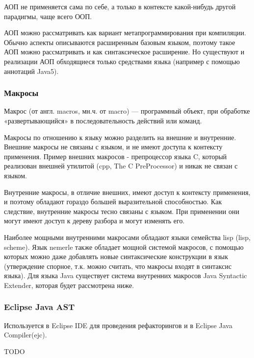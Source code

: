 \documentclass[a4paper,12pt]{article}
\begin{document}
АОП не применяется сама по себе, а только в контексте какой-нибудь другой
парадигмы, чаще всего ООП.

АОП можно рассматривать как вариант метапрограммирования при компиляции.
Обычно аспекты описываются расширенным базовым языком, поэтому такое АОП можно
рассматривать и как синтаксическое расширение. Но существуют и реализации АОП
обходящиеся только средствами языка (например с помощью аннотаций Java5).

\subsubsection{Макросы}
 Макрос (от англ. macros, мн.ч. от macro) — программный объект, при обработке
«развертывающийся» в последовательность действий или команд.

Макросы по отношению к языку можно разделить на внешние и внутренние.
Внешние макросы не связаны с языком, и не имеют доступа к контексту применения.
Пример внешних макросов - препроцессор языка C, который реализован внешней
утилитой (cpp, The C PreProcessor) и никак не связан с языком.

Внутренние макросы, в отличие внешних, имеют доступ к контексту применения, и
поэтому обладают гораздо большей выразительной способностью. Как следствие,
внутренние макросы тесно связаны с языком. При применении они могут имеют
доступ к дереву разбора и могут изменять его.

Наиболее мощными внутренними макросами обладают языки семейства lisp
(lisp, scheme). Язык nemerle также обладает мощной системой макросов, с помощью
которых можно даже добавлять новые синтаксические конструкции в язык
(утверждение спорное, т.к. можно считать, что макросы входят в синтаксис языка).
Для языка Java существует система внутренних макросов Java Syntactic Extender,
которая будет рассмотрена ниже.

\subsubsection{Eclipse Java AST}
Используется в Eclipse IDE для проведения рефакторингов и в Eclipse Java
Compiler(ejc).

TODO
\end{document}
